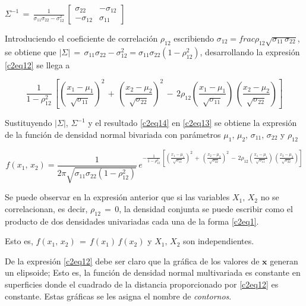 \documentclass[english]{report}
\begin{document}
$\Sigma^{-1}\,=\,\frac{1}{\sigma_{11}\sigma_{22}-\sigma^2_{12}}\,\begin{bmatrix}
\sigma_{22}&-\sigma_{12}\\
-\sigma_{12}&\sigma_{11}
\end{bmatrix}$


Introduciendo el coeficiente de correlación $\rho_{12}$ escribiendo $\sigma_{12}=frac{\rho_{12}}{\sqrt{\sigma_{11}\,\sigma_{22}}}$, se obtiene que $|\Sigma|\,=\,\sigma_{11}\sigma_{22}-\sigma^2_{12}=\sigma_{11}\sigma_{22}(1-\rho^2_{12})$, desarrollando la expresión \ref{c2eq12}  se llega a

\begin{equation}
\frac{1}{1-\rho^2_{12}}\,\left[\left(\frac{x_1-\mu_1}{\sqrt{\sigma_{11}}}\right)^2\,+\,\left(\frac{x_2-\mu_2}{\sqrt{\sigma_{22}}}\right)^2\,-\,2\rho_{12}\left(\frac{x_1-\mu_1}{\sqrt{\sigma_{11}}}\right)\,\left(\frac{x_2-\mu_2}{\sqrt{\sigma_{22}}}\right)\right]
\label{c2eq14}
\end{equation}

Sustituyendo $|\Sigma|$, $\Sigma^{-1}$ y el resultado \ref{c2eq14} en \ref{c2eq13} se obtiene la expresión de la función de densidad normal bivariada con parámetros $\mu_1,\,\mu_2,\,\sigma_{11},\,\sigma_{22}$ y $\rho_{12}$

\begin{equation}
f(x_1,\,x_2)= \frac{1}{2\pi\sqrt{\sigma_{11}\sigma_{22}(1-\rho^2_{12})}}\,e^{-\frac{1}{1-\rho^2_{12}}\,\left[\left(\frac{x_1-\mu_1}{\sqrt{\sigma_{11}}}\right)^2\,+\,\left(\frac{x_2-\mu_2}{\sqrt{\sigma_{22}}}\right)^2\,-\,2\rho_{12}\left(\frac{x_1-\mu_1}{\sqrt{\sigma_{11}}}\right)\,\left(\frac{x_2-\mu_2}{\sqrt{\sigma_{22}}}\right)\right]}
\label{c2eq15}
\end{equation}

Se puede observar en la expresión anterior que si las variables $X_1,\,X_2$ no se correlacionan, es decir, $\rho_{12}\,=\,0$, la densidad conjunta se puede escribir como el producto de dos densidades univariadas cada una de la forma \ref{c2eq1}.

Esto es, $f(x_1,\,x_2)\,=\,f(x_1)\,f(x_2)$ y $X_1,\,X_2$ son independientes.

De la expresión \ref{c2eq12} debe ser claro que la gráfica de los valores de $\textbf{x}$ generan un elipsoide; Esto es, la función de densidad normal multivariada es constante en superficies donde el cuadrado de la distancia proporcionado por \ref{c2eq12} es constante. Estas gráficas se les asigna el nombre de \emph{contornos}.
\end{document}
